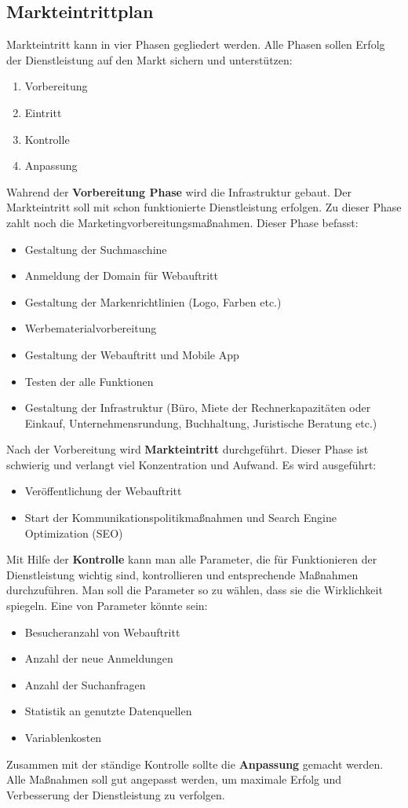 \subsection{Markteintrittplan}

Markteintritt kann in vier Phasen gegliedert werden. Alle Phasen sollen Erfolg der Dienstleistung auf den Markt sichern und unterstützen: 
\begin{enumerate} 
\item Vorbereitung
\item Eintritt 
\item Kontrolle 
\item Anpassung 
\end{enumerate}

Wahrend der \textbf{Vorbereitung Phase} wird die Infrastruktur gebaut. Der Markteintritt soll mit schon funktionierte Dienstleistung erfolgen. Zu dieser Phase zahlt noch die Marketingvorbereitungsmaßnahmen. Dieser Phase befasst:
\begin{itemize}
\item Gestaltung der Suchmaschine
\item Anmeldung der Domain für Webauftritt
\item Gestaltung der Markenrichtlinien (Logo, Farben etc.)
\item Werbematerialvorbereitung
\item Gestaltung der Webauftritt und Mobile App
\item Testen der alle Funktionen 
\item Gestaltung der Infrastruktur (Büro, Miete der Rechnerkapazitäten oder Einkauf, Unternehmensrundung, Buchhaltung, Juristische Beratung etc.)
\end{itemize}

Nach der Vorbereitung wird \textbf{Markteintritt} durchgeführt. Dieser Phase ist schwierig und verlangt viel Konzentration und Aufwand. Es wird ausgeführt:
\begin{itemize}
\item Veröffentlichung der Webauftritt 
\item Start der Kommunikationspolitikmaßnahmen und Search Engine Optimization (SEO)
\end{itemize}

Mit Hilfe der \textbf{Kontrolle} kann man alle Parameter, die für Funktionieren der Dienstleistung wichtig sind, kontrollieren und entsprechende Maßnahmen durchzuführen. Man soll die Parameter so zu wählen, dass sie die Wirklichkeit spiegeln. Eine von Parameter könnte sein:
\begin{itemize}
\item Besucheranzahl von Webauftritt 
\item Anzahl der neue Anmeldungen 
\item Anzahl der Suchanfragen
\item Statistik an genutzte Datenquellen
\item Variablenkosten 
\end{itemize}

Zusammen mit der ständige Kontrolle sollte die \textbf{Anpassung} gemacht werden. Alle Maßnahmen soll gut angepasst werden, um maximale Erfolg und Verbesserung der Dienstleistung zu verfolgen.

